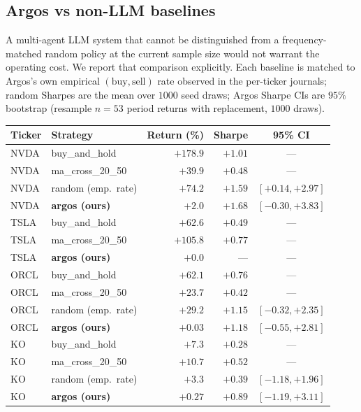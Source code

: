 \documentclass[11pt,a4paper]{article}
\begin{document}
\subsection{Argos vs non-LLM baselines}
\label{sec:results-baselines}

A multi-agent LLM system that cannot be distinguished from a
frequency-matched random policy at the current sample size would
not warrant the operating cost. We report that comparison
explicitly. Each baseline is matched to Argos's own empirical
$(\mathrm{buy}, \mathrm{sell})$ rate observed in the per-ticker
journals; random Sharpes are the mean over $1000$ seed draws;
Argos Sharpe CIs are $95\%$ bootstrap (resample $n{=}53$ period
returns with replacement, $1000$ draws).

\begin{center}\footnotesize
\begin{tabular}{llrrc}
\toprule
Ticker & Strategy & Return (\%) & Sharpe & 95\% CI \\
\midrule
NVDA & buy\_and\_hold         & $+178.9$ & $+1.01$ & --- \\
NVDA & ma\_cross\_20\_50      & $+39.9$  & $+0.48$ & --- \\
NVDA & random (emp.\ rate)    & $+74.2$  & $+1.59$ & $[+0.14, +2.97]$ \\
NVDA & \textbf{argos (ours)}  & $+2.0$   & $\mathbf{+1.68}$ & $[-0.30, +3.83]$ \\
\midrule
TSLA & buy\_and\_hold         & $+62.6$  & $+0.49$ & --- \\
TSLA & ma\_cross\_20\_50      & $+105.8$ & $+0.77$ & --- \\
TSLA & \textbf{argos (ours)}  & $+0.0$   & --- & --- \\
\midrule
ORCL & buy\_and\_hold         & $+62.1$  & $+0.76$ & --- \\
ORCL & ma\_cross\_20\_50      & $+23.7$  & $+0.42$ & --- \\
ORCL & random (emp.\ rate)    & $+29.2$  & $+1.15$ & $[-0.32, +2.35]$ \\
ORCL & \textbf{argos (ours)}  & $+0.03$  & $\mathbf{+1.18}$ & $[-0.55, +2.81]$ \\
\midrule
KO   & buy\_and\_hold         & $+7.3$   & $+0.28$ & --- \\
KO   & ma\_cross\_20\_50      & $+10.7$  & $+0.52$ & --- \\
KO   & random (emp.\ rate)    & $+3.3$   & $+0.39$ & $[-1.18, +1.96]$ \\
KO   & \textbf{argos (ours)}  & $+0.27$  & $\mathbf{+0.89}$ & $[-1.19, +3.11]$ \\
\bottomrule
\end{tabular}
\end{center}
\end{document}
